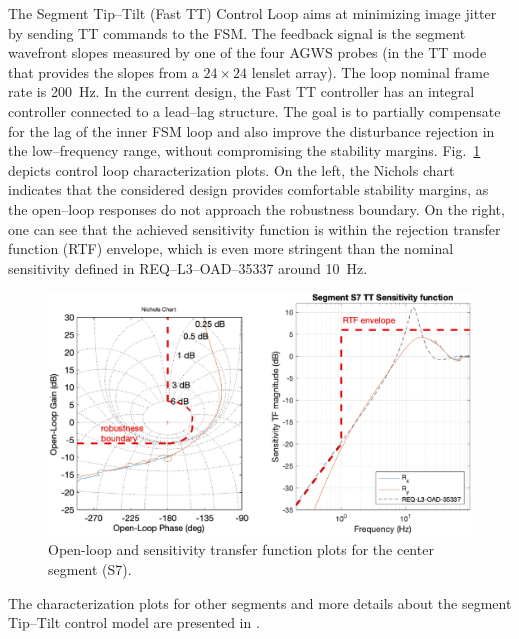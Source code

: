 \documentclass{gmto}
\begin{document}
The Segment Tip--Tilt (Fast TT) Control Loop aims at minimizing image jitter by sending TT commands to the FSM. The feedback signal is the segment wavefront slopes measured by one of the four AGWS probes (in the TT mode that provides the slopes from a $24 \times 24$ lenslet array). The loop nominal frame rate is \SI{200}{Hz}. In the current design, the Fast TT controller has an integral controller connected to a lead--lag structure. The goal is to partially compensate for the lag of the inner FSM loop and also improve the disturbance rejection in the low--frequency range, without compromising the stability margins. Fig.~\ref{fig:ttt_s7_plots} depicts control loop characterization plots. On the left, the Nichols chart indicates that the considered design provides comfortable stability margins, as the open--loop responses do not approach the robustness boundary. On the right, one can see that the achieved sensitivity function is within the rejection transfer function (RTF) envelope, which is even more stringent than the nominal sensitivity defined in REQ--L3--OAD--35337 around \SI{10}{Hz}.
%
\begin{figure}[!htb]
  \centering
  \includegraphics[width=\linewidth]{tt_S7_nichols_T.eps}
  \caption[Open-loop and sensitivity transfer function plots for the center segment.]{Open-loop and sensitivity transfer function plots for the center segment (S7).}
  \label{fig:ttt_s7_plots}
\end{figure}
The characterization plots for other segments and more details about the segment Tip--Tilt control model are presented in \cite[Section~4.3]{GMT.DOC.05154}.

\end{document}
